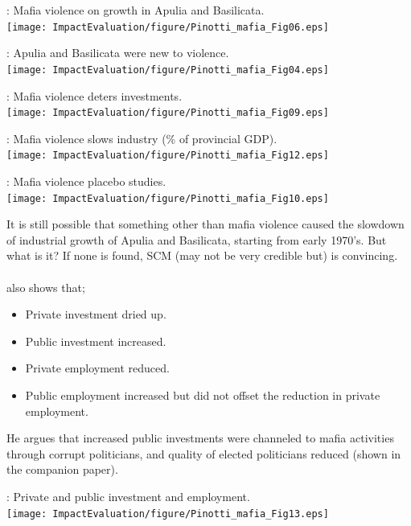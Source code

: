 \begin{frame}{}
\citet{Pinotti2015}: Mafia violence on growth in Apulia and Basilicata.\\
\hfil\texttt{[image: ImpactEvaluation/figure/Pinotti\_mafia\_Fig06.eps]}
\end{frame}
\begin{frame}{}
\citet{Pinotti2015}: Apulia and Basilicata were new to violence.\\
\hfil\texttt{[image: ImpactEvaluation/figure/Pinotti\_mafia\_Fig04.eps]}
\end{frame}
\begin{frame}{}
\citet{Pinotti2015}: Mafia violence deters investments.\\
\hfil\texttt{[image: ImpactEvaluation/figure/Pinotti\_mafia\_Fig09.eps]}
\end{frame}
\begin{frame}{}
\citet{Pinotti2015}: Mafia violence slows industry (\% of provincial GDP).\\
\hfil\texttt{[image: ImpactEvaluation/figure/Pinotti\_mafia\_Fig12.eps]}
\end{frame}
\begin{frame}{}
\citet{Pinotti2015}: Mafia violence placebo studies.\\
\hfil\texttt{[image: ImpactEvaluation/figure/Pinotti\_mafia\_Fig10.eps]}
\end{frame}
\begin{frame}{}
It is still possible that something other than mafia violence caused the slowdown of industrial growth of Apulia and Basilicata, starting from early 1970's. But what is it? If none is found, SCM (may not be very credible but) is convincing.\\~\\

\pause
\citet{Pinotti2015} also shows that;
\begin{itemize}
\vspace{1.0ex}\setlength{\itemsep}{1.0ex}\setlength{\baselineskip}{12pt}
\item<+->	Private investment dried up.
\item<+->	Public investment increased.
\item<+->	Private employment reduced.
\item<+->	Public employment increased but did not offset the reduction in private employment.
\end{itemize}

\vspace{2ex}
\pause
He argues that increased public investments were channeled to mafia activities through corrupt politicians, and quality of elected politicians reduced (shown in the companion paper).
\end{frame}
\begin{frame}{}
\citet{Pinotti2015}: Private and public investment and employment.\\
\hfil\texttt{[image: ImpactEvaluation/figure/Pinotti\_mafia\_Fig13.eps]}
\end{frame}


